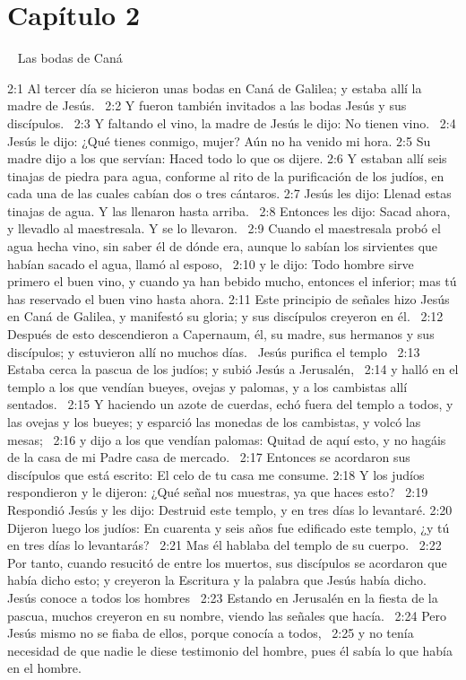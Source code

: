 \section*{Capítulo 2} 
Las bodas de Caná  

2:1 Al tercer día se hicieron unas bodas en Caná de Galilea; y estaba allí la madre de Jesús.  
2:2 Y fueron también invitados a las bodas Jesús y sus discípulos.  
2:3 Y faltando el vino, la madre de Jesús le dijo: No tienen vino.  
2:4 Jesús le dijo: ¿Qué tienes conmigo, mujer? Aún no ha venido mi hora. 
2:5 Su madre dijo a los que servían: Haced todo lo que os dijere. 
2:6 Y estaban allí seis tinajas de piedra para agua, conforme al rito de la purificación de los judíos, en cada una de las cuales cabían dos o tres cántaros. 
2:7 Jesús les dijo: Llenad estas tinajas de agua. Y las llenaron hasta arriba.  
2:8 Entonces les dijo: Sacad ahora, y llevadlo al maestresala. Y se lo llevaron.  
2:9 Cuando el maestresala probó el agua hecha vino, sin saber él de dónde era, aunque lo sabían los sirvientes que habían sacado el agua, llamó al esposo,  
2:10 y le dijo: Todo hombre sirve primero el buen vino, y cuando ya han bebido mucho, entonces el inferior; mas tú has reservado el buen vino hasta ahora. 
2:11 Este principio de señales hizo Jesús en Caná de Galilea, y manifestó su gloria; y sus discípulos creyeron en él.  
2:12 Después de esto descendieron a Capernaum, él, su madre, sus hermanos y sus discípulos; y estuvieron allí no muchos días.  
Jesús purifica el templo   
2:13 Estaba cerca la pascua de los judíos; y subió Jesús a Jerusalén,  
2:14 y halló en el templo a los que vendían bueyes, ovejas y palomas, y a los cambistas allí sentados.  
2:15 Y haciendo un azote de cuerdas, echó fuera del templo a todos, y las ovejas y los bueyes; y esparció las monedas de los cambistas, y volcó las mesas;  
2:16 y dijo a los que vendían palomas: Quitad de aquí esto, y no hagáis de la casa de mi Padre casa de mercado.  
2:17 Entonces se acordaron sus discípulos que está escrito: El celo de tu casa me consume. 
2:18 Y los judíos respondieron y le dijeron: ¿Qué señal nos muestras, ya que haces esto?  
2:19 Respondió Jesús y les dijo: Destruid este templo, y en tres días lo levantaré. 
2:20 Dijeron luego los judíos: En cuarenta y seis años fue edificado este templo, ¿y tú en tres días lo levantarás?  
2:21 Mas él hablaba del templo de su cuerpo.  
2:22 Por tanto, cuando resucitó de entre los muertos, sus discípulos se acordaron que había dicho esto; y creyeron la Escritura y la palabra que Jesús había dicho.  
Jesús conoce a todos los hombres  
2:23 Estando en Jerusalén en la fiesta de la pascua, muchos creyeron en su nombre, viendo las señales que hacía.  
2:24 Pero Jesús mismo no se fiaba de ellos, porque conocía a todos,  
2:25 y no tenía necesidad de que nadie le diese testimonio del hombre, pues él sabía lo que había en el hombre.  
